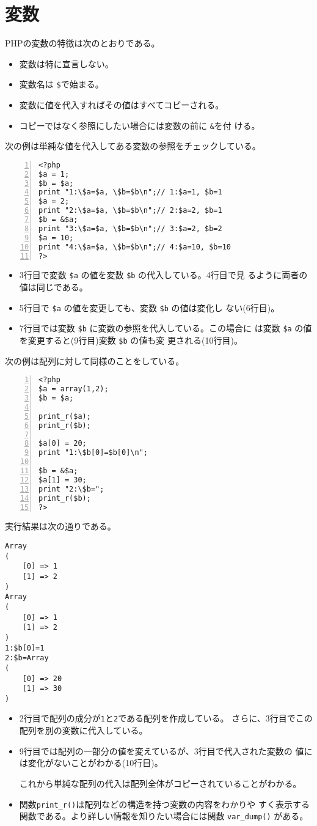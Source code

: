 \section{変数}
PHPの変数の特徴は次のとおりである。
\begin{itemize}
 \item 変数は特に宣言しない。
 \item 変数名は \texttt{\$}で始まる。
 \item 変数に値を代入すればその値はすべてコピーされる。
 \item コピーではなく参照にしたい場合には変数の前に \texttt{\&}を付
ける。
\end{itemize}
\begin{Exec}\upshape\label{PHPsubstitute}
次の例は単純な値を代入してある変数の参照をチェックしている。
\begin{Verbatim}[numbers=left]
<?php
$a = 1;
$b = $a;
print "1:\$a=$a, \$b=$b\n";// 1:$a=1, $b=1
$a = 2;
print "2:\$a=$a, \$b=$b\n";// 2:$a=2, $b=1
$b = &$a;
print "3:\$a=$a, \$b=$b\n";// 3:$a=2, $b=2
$a = 10;
print "4:\$a=$a, \$b=$b\n";// 4:$a=10, $b=10
?>
\end{Verbatim}
 \begin{itemize}
  \item 3行目で変数 \Verb+$a+ の値を変数 \Verb+$b+ の代入している。4行目で見
        るように両者の値は同じである。
  \item 5行目で \Verb+$a+ の値を変更しても、変数 \Verb+$b+ の値は変化し
        ない(6行目)。
  \item 7行目では変数 \Verb+$b+ に変数の参照を代入している。この場合に
        は変数 \Verb+$a+ の値を変更すると(9行目)変数 \Verb+$b+ の値も変
        更される(10行目)。
 \end{itemize}
 次の例は配列に対して同様のことをしている。
\begin{Verbatim}[numbers=left]
<?php
$a = array(1,2);
$b = $a;

print_r($a);
print_r($b);

$a[0] = 20;
print "1:\$b[0]=$b[0]\n";

$b = &$a;
$a[1] = 30;
print "2:\$b=";
print_r($b);
?>
\end{Verbatim}
実行結果は次の通りである。
\begin{Verbatim}
Array
(
    [0] => 1
    [1] => 2
)
Array
(
    [0] => 1
    [1] => 2
)
1:$b[0]=1
2:$b=Array
(
    [0] => 20
    [1] => 30
)

\end{Verbatim}
\begin{itemize}
 \item 2行目で配列の成分が\texttt{1}と\texttt{2}である配列を作成している。
       さらに、3行目でこの配列を別の変数に代入している。
 \item 9行目では配列の一部分の値を変えているが、3行目で代入された変数の
       値には変化がないことがわかる(10行目)。

       これから単純な配列の代入は配列全体がコピーされていることがわかる。
 \item 関数\texttt{print\_r()}は配列などの構造を持つ変数の内容をわかりや
 すく表示する関数である。より詳しい情報を知りたい場合には関数
       \Verb+var_dump()+ がある。
\end{itemize}
\end{Exec}
